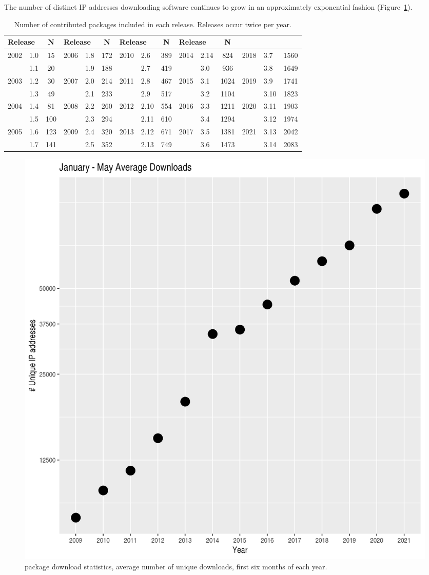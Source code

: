 \documentclass[letterpaper]{article}
\begin{document}
The number of distinct IP addresses downloading software continues to
grow in an approximately exponential fashion
(Figure~\ref{fig:download-stats}).

\begin{table}[b]
  \begin{center}
    \caption{Number of contributed packages included in each
      \Bioconductor{} release.  Releases occur twice per year.}
    \label{tbl:analysis_pkgs}
    \begin{tabular}{llc|llc|llc|llc|llc}
      \\
      \multicolumn{2}{l}{Release} & N & 
      \multicolumn{2}{l}{Release} & N & 
      \multicolumn{2}{l}{Release} & N &
      \multicolumn{2}{l}{Release} & N \\\hline\noalign{\smallskip}
      2002 & 1.0 & 15    & 2006 & 1.8 & 172  & 2010 & 2.6 & 389 & 2014 & 2.14 & 824  & 2018 & 3.7  & 1560\\ 
           & 1.1 & 20    &      & 1.9 & 188  &      & 2.7 & 419 &      & 3.0  & 936  &      & 3.8  & 1649\\
      2003 & 1.2 & 30    & 2007 & 2.0 & 214  & 2011 & 2.8 & 467 & 2015 & 3.1  & 1024 & 2019 & 3.9  & 1741\\
           & 1.3 & 49    &      & 2.1 & 233  &      & 2.9 & 517 &      & 3.2  & 1104 &      & 3.10 & 1823\\
      2004 & 1.4 & 81    & 2008 & 2.2 & 260  & 2012 & 2.10 & 554& 2016 & 3.3  & 1211 & 2020 & 3.11 & 1903\\
           & 1.5 & 100   &      & 2.3 & 294  &      & 2.11 & 610&      & 3.4  & 1294 &      & 3.12 & 1974\\
      2005 & 1.6 & 123   & 2009 & 2.4 & 320  & 2013 & 2.12 & 671& 2017 & 3.5  & 1381 & 2021 & 3.13 & 2042\\
           & 1.7 & 141   &      & 2.5 & 352  &      & 2.13 & 749&      & 3.6  & 1473 &      & 3.14 & 2083\\
    \end{tabular}
  \end{center}
\end{table}

\begin{figure}
  \begin{center}
    \includegraphics[width=.5\textwidth,height=!]{download-stats-2021}
    \caption{\Bioconductor{} package download statistics, average number
      of unique downloads, first six months of each year.}
    \label{fig:download-stats}
  \end{center}
\end{figure}
\end{document}
